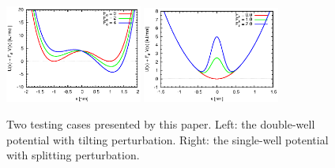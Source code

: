 \documentclass[aip,jcp,a4paper,reprint,onecolumn]{revtex4-1}
\begin{document}
\begin{figure}
  \centering
  \includegraphics[width=0.4\textwidth]{figs/fig-tilt-pot.eps}
  \includegraphics[width=0.4\textwidth]{figs/fig-split-pot.eps}
  \caption{Two testing cases presented by this paper.
    Left: the double-well potential with tilting perturbation.
    Right: the single-well potential with splitting perturbation.}
  \label{fig:new-tmp1}
\end{figure}
\end{document}
